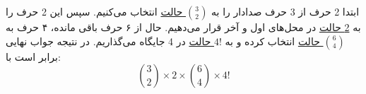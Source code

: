 \p
    ابتدا 2 حرف از 3 حرف صدادار را به 
    \underline{${3\choose 2}$ حالت}
    انتخاب می‌کنیم. سپس این 2 حرف را به 
    \underline{2 حالت}
     در محل‌های اول و آخر قرار می‌دهیم.
    حال از ۶ حرف باقی مانده، ۴ حرف به 
    \underline{${6\choose 4}$ حالت}
    انتخاب کرده و به 
    \underline{$4!$ حالت}
    در 4 جایگاه می‌گذاریم.
    در نتیجه جواب نهایی برابر است با:
    $${3\choose 2} \times 2 \times {6\choose 4} \times 4!$$
    
